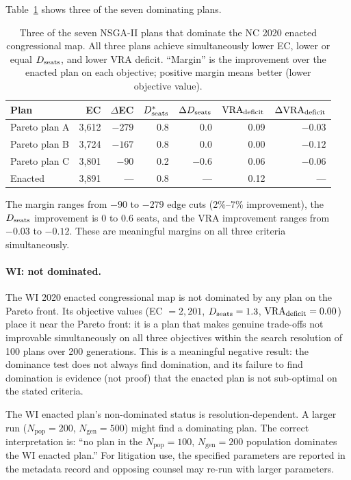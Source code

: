 Table~\ref{tab:nc-dominated-examples} shows three of the seven dominating
plans.

\begin{table}[t]
\centering
\caption{%
  Three of the seven NSGA-II plans that dominate the NC 2020 enacted
  congressional map.
  All three plans achieve simultaneously lower EC, lower or equal $D_{\mathrm{seats}}$,
  and lower VRA deficit.
  ``Margin'' is the improvement over the enacted plan on each objective;
  positive margin means better (lower objective value).
}
\label{tab:nc-dominated-examples}
\renewcommand{\arraystretch}{1.3}
\begin{tabular}{@{}lrrrrrr@{}}
\toprule
Plan & EC & $\Delta$EC & $D_{\mathrm{seats}}^*$ & $\Delta D_{\mathrm{seats}}$ & $\mathrm{VRA}_{\mathrm{deficit}}$ & $\Delta\mathrm{VRA}_{\mathrm{deficit}}$ \\
\midrule
Pareto plan A & 3{,}612 & $-279$ & 0.8 & 0.0  & 0.09 & $-0.03$ \\
Pareto plan B & 3{,}724 & $-167$ & 0.8 & 0.0  & 0.00 & $-0.12$ \\
Pareto plan C & 3{,}801 & $-90$  & 0.2 & $-0.6$ & 0.06 & $-0.06$ \\
Enacted       & 3{,}891 & ---    & 0.8 & ---  & 0.12 & --- \\
\bottomrule
\end{tabular}
\end{table}

The margin ranges from $-90$ to $-279$ edge cuts (2\%--7\% improvement),
the $D_{\mathrm{seats}}$ improvement is 0 to 0.6 seats, and the VRA improvement
ranges from $-0.03$ to $-0.12$.
These are meaningful margins on all three criteria simultaneously.

\paragraph{WI: not dominated.}
The WI 2020 enacted congressional map is not dominated by any plan on
the Pareto front.
Its objective values (EC $= 2{,}201$, $D_{\mathrm{seats}} = 1.3$, $\mathrm{VRA}_{\mathrm{deficit}} = 0.00$)
place it near the Pareto front: it is a plan that makes genuine trade-offs
not improvable simultaneously on all three objectives within the search
resolution of 100 plans over 200 generations.
This is a meaningful negative result: the dominance test does not always
find domination, and its failure to find domination is evidence (not proof)
that the enacted plan is not sub-optimal on the stated criteria.

\begin{remark}
\label{rem:wi-resolution}
The WI enacted plan's non-dominated status is resolution-dependent.
A larger \nsga{} run ($N_{\mathrm{pop}} = 200$, $N_{\mathrm{gen}} = 500$)
might find a dominating plan.
The correct interpretation is: ``no plan in the $N_{\mathrm{pop}} = 100$,
$N_{\mathrm{gen}} = 200$ population dominates the WI enacted plan.''
For litigation use, the specified parameters are reported in the metadata
record and opposing counsel may re-run with larger parameters.
\end{remark}


